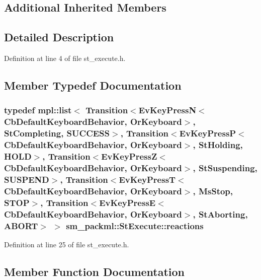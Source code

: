 \subsection*{Additional Inherited Members}


\subsection{Detailed Description}


Definition at line 4 of file st\+\_\+execute.\+h.



\subsection{Member Typedef Documentation}
\subsubsection[{\texorpdfstring{reactions}{reactions}}]{\setlength{\rightskip}{0pt plus 5cm}typedef mpl\+::list$<$ Transition$<$Ev\+Key\+PressN$<$Cb\+Default\+Keyboard\+Behavior, {\bf Or\+Keyboard}$>$, {\bf St\+Completing}, {\bf S\+U\+C\+C\+E\+SS}$>$, Transition$<$Ev\+Key\+PressP$<$Cb\+Default\+Keyboard\+Behavior, {\bf Or\+Keyboard}$>$, {\bf St\+Holding}, {\bf H\+O\+LD}$>$, Transition$<$Ev\+Key\+PressZ$<$Cb\+Default\+Keyboard\+Behavior, {\bf Or\+Keyboard}$>$, {\bf St\+Suspending}, {\bf S\+U\+S\+P\+E\+ND}$>$, Transition$<$Ev\+Key\+PressT$<$Cb\+Default\+Keyboard\+Behavior, {\bf Or\+Keyboard}$>$, {\bf Ms\+Stop}, {\bf S\+T\+OP}$>$, Transition$<$Ev\+Key\+PressE$<$Cb\+Default\+Keyboard\+Behavior, {\bf Or\+Keyboard}$>$, {\bf St\+Aborting}, {\bf A\+B\+O\+RT}$>$ $>$ {\bf sm\+\_\+packml\+::\+St\+Execute\+::reactions}}\hypertarget{structsm__packml_1_1StExecute_af118309910aebee1f998960eb0fad7a0}{}\label{structsm__packml_1_1StExecute_af118309910aebee1f998960eb0fad7a0}


Definition at line 25 of file st\+\_\+execute.\+h.



\subsection{Member Function Documentation}
